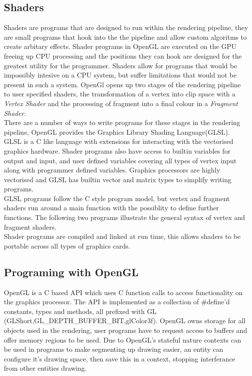 \subsection{Shaders}
Shaders are programs that are designed to run within the rendering pipeline, they
are small programs that hook into the the pipeline and allow custom algoritms to
create arbitary effects. Shader programs in OpenGL are executed on the GPU 
freeing up CPU processing and the positions they can hook are designed for the
greatest utility for the programmer. Shaders allow for programs that would be 
impossibly intesive on a CPU system, but suffer limitations that would not be 
present in such a system.
OpenGl opens up two stages of the rendering
pipeline to user specified shaders, the transformation of a vertex into clip 
space with a \emph{Vertex Shader} and the processing of fragment into a final
colour in a \emph{Fragment Shader}.\\

There are a number of ways to write programs for these stages in the rendering
pipeline, OpenGL provides the Graphics Library Shading Language(GLSL). GLSL is 
a C like language with extensions for interacting with the vectorised graphics
hardware. Shader programs also have access to builtin variables for output and
input, and user defined variables covering all types of vertex input along with
programmer defined variables. Graphics processors are highly vectorised and GLSL
has builtin vector and matrix types to simplify writing programs.\\

GLSL programs follow the C style program model, but vertex and fragment shaders 
run around a main function with the possiblity to define further functions. The 
following two programs illustrate the general syntax of vertex and fragment 
shaders.\\





Shader programs are compiled and linked at run time, this allows shaders to be 
portable across all types of graphics cards.\\

\subsection{Programing with OpenGL}
OpenGL is a C based API which uses C function calls to access functionality on 
the graphics processor. The API is implemented as a collection of \#define'd 
constants, types and methods, all prefixed with GL 
(GLShort,GL\_DEPTH\_BUFFER\_BIT,glColor3f). OpenGL owns storage for all objects
used in the rendering, user programs have to request access to buffers and offer
memory regions to be used. Due to OpenGL's stateful nature contexts can be used 
in programs to make segmenting up drawing easier, an entity can configure it's 
drawing space, then save this in a context, stopping interferance from other 
entities drawing. \\

